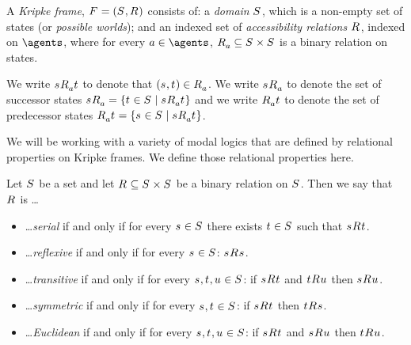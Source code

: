\begin{definition}
A {\em Kripke frame}, $\kFrameAndTuple$ consists of:
a {\em domain} $\kStates$, which is a non-empty set of states (or {\em possible worlds}); and
an indexed set of {\em accessibility relations} $\kAccessibilityRel$, indexed on $\agents$, where for every $\agentA \in \agents$, $\kAccessibilityA \subseteq \kStates \times \kStates$ is a binary relation on states.
\end{definition}

We write $\kStateS \kAccessibilityA \kStateT$ to denote that $(\kStateS, \kStateT) \in \kAccessibilityA$.
We write $\kSuccessorsA{\kStateS}$ to denote the set of successor states $\kSuccessorsA{\kStateS} = \{\kStateT \in \kStates \mid \kStateS \kAccessibilityA \kStateT\}$ and
we write $\kPredecessorsA{\kStateT}$ to denote the set of predecessor states $\kPredecessorsA{\kStateT} = \{\kStateS \in \kStates \mid \kStateS \kAccessibilityA \kStateT\}$.

We will be working with a variety of modal logics that are defined by relational properties on Kripke frames.
We define those relational properties here.

\begin{definition}
Let $\kStates$ be a set and let $\kAccessibilityRel \subseteq \kStates \times \kStates$ be a binary relation on $\kStates$. 
Then we say that $\kAccessibilityRel$ is \ldots
\begin{itemize}
    \item \ldots {\em serial} if and only if for every $\kStateS \in \kStates$ there exists $\kStateT \in \kStates$ such that $\kStateS \kAccessibility{} \kStateT$.
    \item \ldots {\em reflexive} if and only if for every $\kStateS \in \kStates$: $\kStateS \kAccessibility{} \kStateS$.
    \item \ldots {\em transitive} if and only if for every $\kStateS, \kStateT, \kStateU \in \kStates$: if $\kStateS \kAccessibility{} \kStateT$ and $\kStateT \kAccessibility{} \kStateU$ then $\kStateS \kAccessibility{} \kStateU$.
    \item \ldots {\em symmetric} if and only if for every $\kStateS, \kStateT \in \kStates$: if $\kStateS \kAccessibility{} \kStateT$ then $\kStateT \kAccessibility{} \kStateS$.
    \item \ldots {\em Euclidean} if and only if for every $\kStateS, \kStateT, \kStateU \in \kStates$: if $\kStateS \kAccessibility{} \kStateT$ and $\kStateS \kAccessibility{} \kStateU$ then $\kStateT \kAccessibility{} \kStateU$.
\end{itemize}
\end{definition}

